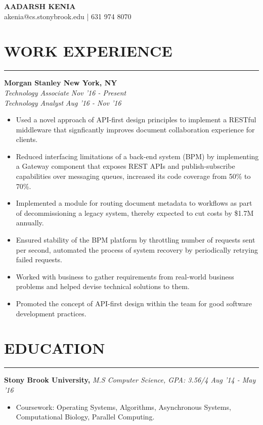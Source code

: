 \documentclass[12pt]{article}
\newcommand{\sectionHeading}[1]{
\section*{\small{#1}}
\vspace{-8pt}
\hrule
\vspace{8pt}
}
\newcommand{\experienceSectionSubheadingAlternate}[6]{
  \vspace{-1pt}
    \small{\textbf{Morgan Stanley \hfill New York, NY}} \\
    \small{\textit{#3} \hfill \textit{#4}} \\
    \small{\textit{#5} \hfill \textit{#6}} \\
    \vspace{-15pt}
}
\newcommand{\educationSectionSubheading}[3]{
    \noindent \small{\textbf{#1, }\textit{#2 \hfill #3}} \vspace{-20pt}\\
}
\newcommand{\sectionListStart}{\begin{itemize}[label={\small{\textbullet}},noitemsep]}
\newcommand{\sectionListEnd}{\end{itemize}}
\newcommand{\sectionListItem}[1]{\item \small{#1}}
\begin{document}
\begin{center}
\LARGE{\textbf{AADARSH KENIA}}\\
\vspace{4pt}
\small{\Letter \hspace{1mm}akenia@cs.stonybrook.edu} | \Telefon \hspace{1mm}631 974 8070
\end{center}

\sectionHeading{WORK EXPERIENCE}
\experienceSectionSubheadingAlternate
{Morgan Stanley}{New York, NY}
{Technology Associate}{Nov '16 - Present}
{Technology Analyst}{Aug '16 - Nov '16}
\sectionListStart
    \sectionListItem
        Used a novel approach of API-first design principles to implement a RESTful middleware that signficantly improves document collaboration experience for clients.
    \sectionListItem
        Reduced interfacing limitations of a back-end system (BPM) by implementing a Gateway component that exposes REST APIs and publish-subscribe capabilities over messaging queues, increased its code coverage from 50\% to 70\%.

    \sectionListItem
        Implemented a module for routing document metadata to workflows as part of decommissioning a legacy system, thereby expected to cut costs by \$1.7M annually.

    \sectionListItem
        Ensured stability of the BPM platform by throttling number of requests sent per second, automated the process of system recovery by periodically retrying failed requests.
    \sectionListItem
        Worked with business to gather requirements from real-world business problems and helped devise technical solutions to them.
    \sectionListItem
        Promoted the concept of API-first design within the team for good software development practices.
\sectionListEnd


\sectionHeading{EDUCATION}
\educationSectionSubheading
{Stony Brook  University}{M.S Computer Science, GPA: 3.56/4}{Aug '14 - May '16}
\sectionListStart
    \sectionListItem
        Coursework: Operating Systems, Algorithms, Asynchronous Systems, Computational Biology, Parallel Computing. 
\sectionListEnd
\end{document}
